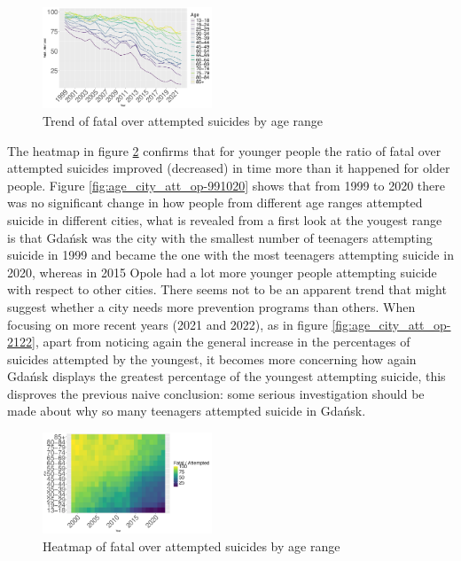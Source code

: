 \documentclass{article}
\begin{document}
\begin{figure}[H]
    \centering
    \includegraphics[width=0.45\textwidth]{imgs/age_foa.pdf}
    \caption{Trend of fatal over attempted suicides by age range}
    \label{fig:age_foa}
\end{figure}
%
The heatmap in figure \ref{fig:age_foa_heat} confirms that for younger people the ratio of fatal over 
attempted suicides improved (decreased) in time more than it happened for older people.
Figure \ref{fig:age_city_att_op-991020} shows that from 1999 to 2020 there was no significant 
change in how people from different age ranges attempted suicide in different cities,
what is revealed from a first look at the yougest range is that Gdańsk was the city with the
smallest number of teenagers attempting suicide in 1999 and became the one with the most
teenagers attempting suicide in 2020, whereas in 2015 Opole had a lot more younger people
attempting suicide with respect to other cities. 
There seems not to be an apparent trend that might suggest 
whether a city needs more prevention programs than others.
When focusing on more recent years (2021 and 2022), as in figure \ref{fig:age_city_att_op-2122},
apart from noticing again the general increase in the percentages of suicides attempted by
the youngest, it becomes more concerning how again Gdańsk displays
the greatest percentage of the youngest attempting suicide, this disproves
the previous naive conclusion: some serious investigation should be made
about why so many teenagers attempted suicide in Gdańsk.
% 
%
\begin{figure}[H]
    \centering
    \includegraphics[width=0.45\textwidth]{imgs/age_foa_heat.pdf}
    \caption{Heatmap of fatal over attempted suicides by age range}
    \label{fig:age_foa_heat}
\end{figure}
\end{document}
